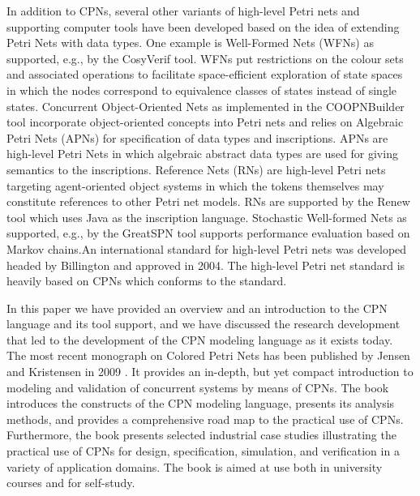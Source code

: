 In addition to CPNs, several other variants of high-level Petri nets
and supporting computer tools have been developed based on the idea of
extending Petri Nets with data types. One example is Well-Formed Nets
(WFNs) \cite{wfns} as supported, e.g., by the CosyVerif tool. WFNs put
restrictions on the colour sets and associated operations to
facilitate space-efficient exploration of state spaces in which the
nodes correspond to equivalence classes of states instead of single
states. Concurrent Object-Oriented Nets \cite{coopn} as implemented in
the COOPNBuilder tool incorporate object-oriented concepts into Petri
nets and relies on Algebraic Petri Nets (APNs) \cite{apn} for
specification of data types and inscriptions. APNs are high-level
Petri Nets in which algebraic abstract data types are used for giving
semantics to the inscriptions. Reference Nets (RNs) \cite{rns} are
high-level Petri nets targeting agent-oriented object systems in which
the tokens themselves may constitute references to other Petri net
models. RNs are supported by the Renew tool which uses Java as the
inscription language. Stochastic Well-formed Nets \cite{swns} as
supported, e.g., by the GreatSPN tool supports performance evaluation
based on Markov chains.An international standard for high-level Petri
nets was developed headed by Billington \cite{hcpnstandard} and
approved in 2004. The high-level Petri net standard is heavily based
on CPNs which conforms to the standard.



In this paper we have provided an overview and an introduction to the
CPN language and its tool support, and we have discussed the research
development that led to the development of the CPN modeling language
as it exists today. The most recent monograph on Colored Petri Nets
has been published by Jensen and Kristensen in 2009
\cite{newcpnbook}. It provides an in-depth, but yet compact
introduction to modeling and validation of concurrent systems by means
of CPNs. The book introduces the constructs of the CPN modeling
language, presents its analysis methods, and provides a comprehensive
road map to the practical use of CPNs. Furthermore, the book presents
selected industrial case studies illustrating the practical use of
CPNs for design, specification, simulation, and verification in a
variety of application domains. The book is aimed at use both in
university courses \cite{teaching} and for self-study.

